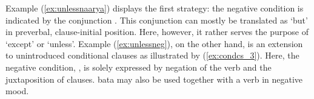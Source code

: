 Example (\ref{ex:unlessnaarya}) displays the first strategy: the negative
condition is indicated by the conjunction . This conjunction
can mostly be translated as `but' in preverbal, clause-initial position. Here,
however, it rather serves the purpose of `except' or `unless'. Example
(\ref{ex:unlessneg}), on the other hand, is an extension to unintroduced
conditional clauses as illustrated by (\ref{ex:condcs_3}). Here, the negative
condition, , is solely
expressed by negation of the verb and the juxtaposition of clauses. 
{bata} may also be used together with a verb in negative mood.
